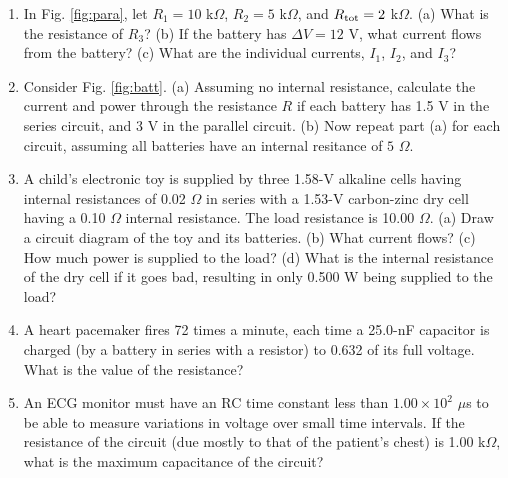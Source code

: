 \documentclass[12pt,twocolumn]{article}
\begin{document}
\begin{enumerate}
\item In Fig. \ref{fig:para}, let $R_1 = 10$ k$\Omega$, $R_2 = 5$ k$\Omega$, and $R_{\rm tot} = 2$ k$\Omega$.  (a) What is the resistance of $R_3$? (b) If the battery has $\Delta V = 12$ V, what current flows from the battery? (c) What are the individual currents, $I_1$, $I_2$, and $I_3$? \\ \vspace{3.5cm}
\item Consider Fig. \ref{fig:batt}. (a) Assuming no internal resistance, calculate the current and power through the resistance $R$ if each battery has 1.5 V in the series circuit, and 3 V in the parallel circuit. (b) Now repeat part (a) for each circuit, assuming all batteries have an internal resitance of $5$ $\Omega$. \\ \vspace{3cm}
\item A child's electronic toy is supplied by three 1.58-V alkaline cells having internal resistances of 0.02 $\Omega$ in series with a 1.53-V carbon-zinc dry cell having a 0.10 $\Omega$ internal resistance. The load resistance is 10.00 $\Omega$. (a) Draw a circuit diagram of the toy and its batteries. (b) What current flows? (c) How much power is supplied to the load? (d) What is the internal resistance of the dry cell if it goes bad, resulting in only 0.500 W being supplied to the load? \\ \vspace{4cm}
\item A heart pacemaker fires 72 times a minute, each time a 25.0-nF capacitor is charged (by a battery in series with a resistor) to 0.632 of its full voltage. What is the value of the resistance? \\ \vspace{5cm}
\item An ECG monitor must have an RC time constant less than $1.00 \times 10^2$ $\mu$s to be able to measure variations in voltage over small time intervals. If the resistance of the circuit (due mostly to that of the patient’s chest) is 1.00 k$\Omega$, what is the maximum capacitance of the circuit? \\
\end{enumerate}
\end{document}
